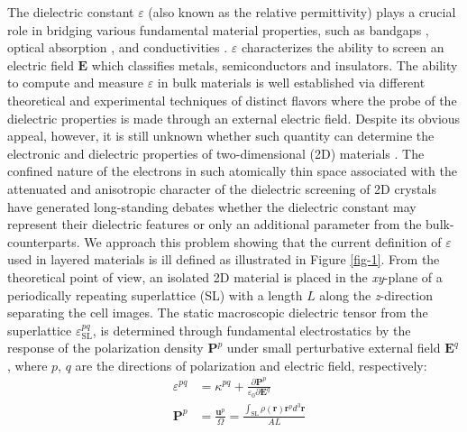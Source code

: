 \documentclass[journal=ancac3,manuscript=article,email=true,hyperref=true,keywords=false]{achemso}
\begin{document}
The dielectric constant $\varepsilon$ (also known as the relative
permittivity) plays a crucial role in bridging various fundamental
material properties, such as bandgaps
\cite{Moss_1950_relation,Moss_1985_n_Eg}, optical absorption
\cite{kittel_2005_introduction}, and conductivities
\cite{Dressel_2001_electrodynamics}. $\varepsilon$ characterizes the
ability to screen an electric field $\boldsymbol{E}$ which classifies
metals, semiconductors and insulators.  
The ability to compute and measure
$\varepsilon$ in bulk materials is well established via different
theoretical and experimental techniques of distinct flavors where the
probe of the dielectric properties is made through an external
electric field.
%
Despite its obvious appeal, however, it is still unknown whether such quantity can determine the 
electronic and dielectric properties of two-dimensional (2D) materials \cite{Novoselov_2016}.  
%
%
The confined nature of the electrons in such atomically thin space associated with the 
attenuated and anisotropic character of the dielectric screening of 2D crystals 
\cite{Keldysh_1979_eps_multi,Sharma_1985,Low_2014_screening_BP,Cudazzo_2011_screening_2D,Bechstedt_2012,Cudazzo_2010_screen2D,Nazarov_2015_2D_3D}
have generated long-standing debates whether the dielectric constant 
may represent their dielectric features or only an 
additional parameter from the bulk-counterparts. 
We approach this problem showing that the current definition of
$\varepsilon$ used in layered materials is ill defined as illustrated
in Figure \ref{fig-1}.  From the theoretical point of view, an
isolated 2D material is placed in the \textit{xy}-plane of a
periodically repeating superlattice (SL) with a length $L$ along the
\textit{z}-direction separating the cell images. The static macroscopic
dielectric tensor from the superlattice
$\varepsilon_{\mathrm{SL}}^{pq}$, is determined through fundamental
electrostatics by the response of the polarization density
$\boldsymbol{P}^{p}$ under small perturbative external field
$\boldsymbol{E}^{q}$, where $p$, $q$ are the directions of
polarization and electric field,
respectively\cite{Dressel_2001_electrodynamics}:
\begin{subequations}
  \begin{eqnarray}
      \label{eq:def-eps-1}
    &\varepsilon^{pq} &= \kappa^{pq} +
                                 {\displaystyle \frac{\partial \boldsymbol{P}^{p}}
                                 {\varepsilon_{0} \partial \boldsymbol{E}^{q}}} \\
          \label{eq:def-eps-2}
    &\boldsymbol{P}^{p} &=  {\displaystyle \frac{\boldsymbol{u}^{p}}{\Omega}}
                          = {\displaystyle \frac{{\displaystyle
          \int_{\mathrm{SL}} \rho(\boldsymbol{r}) \boldsymbol{r}^{p} d^{3}\boldsymbol{r}}}
                          {AL}}
  \end{eqnarray}
\end{subequations}
\end{document}
